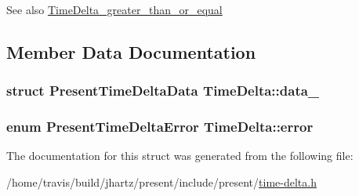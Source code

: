 \begin{DoxySeeAlso}{\-See also}
\hyperlink{time-delta_8h_aca2a28b813b68c66a3754ecf311350b8}{\-Time\-Delta\-\_\-greater\-\_\-than\-\_\-or\-\_\-equal} 
\end{DoxySeeAlso}


\subsection{\-Member \-Data \-Documentation}
\hypertarget{structTimeDelta_ab88989772d6ab486e1e008238d96eb81}{
\subsubsection[{data\-\_\-}]{\setlength{\rightskip}{0pt plus 5cm}struct \-Present\-Time\-Delta\-Data {\bf \-Time\-Delta\-::data\-\_\-}}}\label{structTimeDelta_ab88989772d6ab486e1e008238d96eb81}
\hypertarget{structTimeDelta_a212d89d50dc636a4e12ceac5fd9f0bfd}{
\subsubsection[{error}]{\setlength{\rightskip}{0pt plus 5cm}enum {\bf \-Present\-Time\-Delta\-Error} {\bf \-Time\-Delta\-::error}}}\label{structTimeDelta_a212d89d50dc636a4e12ceac5fd9f0bfd}


\-The documentation for this struct was generated from the following file\-:\begin{DoxyCompactItemize}
\item 
/home/travis/build/jhartz/present/include/present/\hyperlink{time-delta_8h}{time-\/delta.\-h}\end{DoxyCompactItemize}
